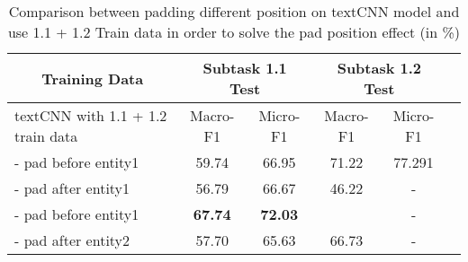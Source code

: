\begin{table}[htbp!] %
    \begin{tabular}{lccccc}
    \toprule
        \multicolumn{1}{c}{Training Data}            & \multicolumn{2}{c}{Subtask 1.1 Test}  & \multicolumn{2}{c}{Subtask 1.2 Test} \\
    \midrule
        textCNN with 1.1 + 1.2 train data            & Macro-F1         & Micro-F1           & Macro-F1         & Micro-F1       \\
    \midrule
                    
        - pad before entity1                         & 59.74            & 66.95              & 71.22            & 77.291         \\
        - pad after entity1                          & 56.79            & 66.67              & 46.22            & -              \\
        - pad before entity1                         & \bf67.74         & \bf72.03           &                  & -              \\
        - pad after entity2                          & 57.70            & 65.63              & 66.73            & -              \\
    \bottomrule
    \end{tabular}
\caption{Comparison between padding different position on textCNN model and use 1.1 + 1.2 Train data in order to solve the pad position effect (in \%)}
\label{tab:data_pad}
\end{table}
